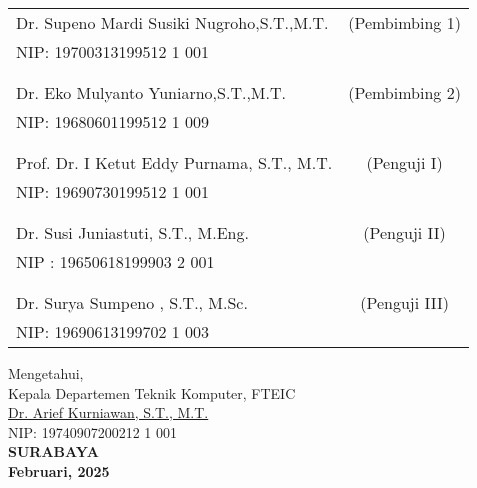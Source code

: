 \noindent
    \begin{tabularx}{\textwidth}{X c}
      Dr. Supeno Mardi Susiki Nugroho,S.T.,M.T.          & (Pembimbing 1) \\
      NIP: 19700313199512 1 001       & \\
      &  \\
      &  \\
      Dr. Eko Mulyanto Yuniarno,S.T.,M.T.     & (Pembimbing 2) \\
      NIP: 19680601199512 1 009       & \\
      &  \\
      &  \\
      Prof. Dr. I Ketut Eddy Purnama, S.T., M.T.  & (Penguji I) \\
      NIP: 19690730199512 1 001       & \\
      &  \\
      &  \\
      Dr. Susi Juniastuti, S.T., M.Eng.  & (Penguji II) \\
      NIP : 19650618199903 2 001       & \\
      &  \\
      &  \\
      Dr. Surya Sumpeno , S.T., M.Sc.            & (Penguji III) \\
      NIP: 19690613199702 1 003        & \\
    \end{tabularx}
\endgroup
\vspace{2ex}
\begin{center}
    Mengetahui,\\
  Kepala Departemen Teknik Komputer, FTEIC\\
  \vspace{10ex}
  \underline{Dr. Arief Kurniawan, S.T., M.T. }\\
  NIP: 19740907200212 1 001 \\
  \vspace{10ex}
  \textbf{SURABAYA} \\
  \textbf{Februari, 2025}
\end{center}
\endgroup